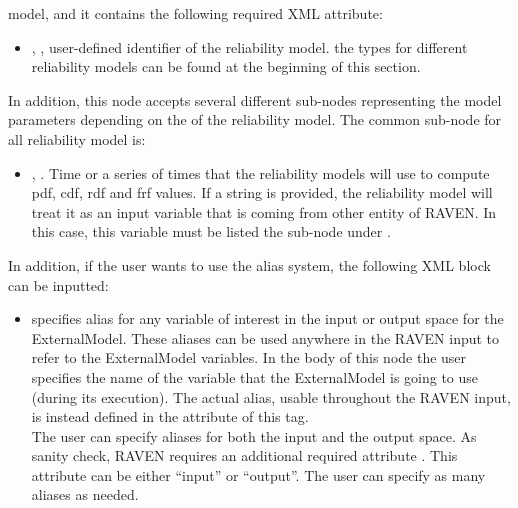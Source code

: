 \begin{itemize}
	model, and it contains the following required XML attribute:
	\begin{itemize}
		\item {}, , user-defined identifier of the reliability model.
		\nb the types for different reliability models can be found at the beginning of this section.
	\end{itemize}
	In addition, this node accepts several different sub-nodes representing the model parameters depending on the
	 of the reliability model. The common sub-node for all reliability model is:
	\begin{itemize}
		\item {}, . Time or a series
		of times that the reliability models will use to compute pdf, cdf, rdf and frf values. If a string is provided,
		the reliability model will treat it as an input variable that is coming from other entity of RAVEN. In this
		case, this variable must be listed the sub-node  under .
	\end{itemize}
\end{itemize}
In addition, if the user wants to use the alias system, the following XML block can be inputted:
\begin{itemize}
	\item {}  specifies alias for
	any variable of interest in the input or output space for the ExternalModel.
	These aliases can be used anywhere in the RAVEN input to refer to the ExternalModel
	variables.
	In the body of this node the user specifies the name of the variable that the ExternalModel is
	going to use (during its execution).
	The actual alias, usable throughout the RAVEN input, is instead defined in the
	 attribute of this tag.
	\\The user can specify aliases for both the input and the output space. As sanity check, RAVEN
	requires an additional required attribute . This attribute can be either ``input'' or ``output''.
	\nb The user can specify as many aliases as needed.
\end{itemize}

